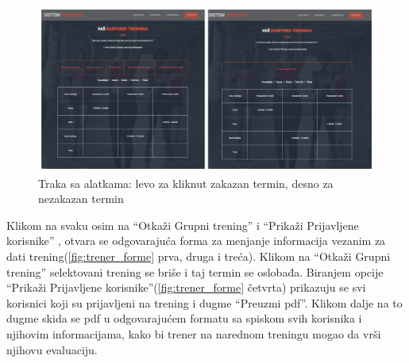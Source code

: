 \documentclass[../main.tex]{subfiles}
\begin{document}
\begin{figure}[!ht]
\begin{center}
\includegraphics[scale=0.35]{sections/korisnicki_interfejs/screenshots/trener_raspored_toolbar.png}
\end{center}
\caption{ Traka sa alatkama: levo za kliknut zakazan termin, desno za nezakazan termin }
\label{fig:trener_toolbar}
\end{figure}

Klikom na svaku osim na ``Otkaži Grupni trening'' i ``Prikaži Prijavljene korisnike'' , otvara se odgovarajuća forma za menjanje informacija vezanim za dati trening(\ref{fig:trener_forme} prva, druga i treća). 
Klikom na ``Otkaži Grupni trening'' selektovani trening se briše i taj termin se oslobađa. 
Biranjem opcije ``Prikaži Prijavljene korisnike''(\ref{fig:trener_forme} četvrta) prikazuju se svi korisnici koji su prijavljeni na trening i dugme ``Preuzmi pdf''. Klikom dalje na to dugme skida se pdf u odgovarajućem formatu sa spiskom svih korisnika i njihovim informacijama, kako bi trener na narednom treningu mogao da vrši njihovu evaluaciju.
\end{document}
